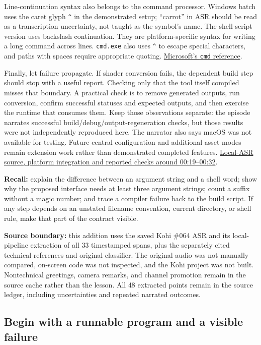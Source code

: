 Line-continuation syntax also belongs to the command processor. Windows batch uses the caret glyph \texttt{\^{}} in the demonstrated setup; ``carrot'' in ASR should be read as a transcription uncertainty, not taught as the symbol's name. The shell-script version uses backslash continuation. They are platform-specific syntax for writing a long command across lines. \texttt{cmd.exe} also uses \texttt{\^{}} to escape special characters, and paths with spaces require appropriate quoting. \href{https://learn.microsoft.com/en-us/windows-server/administration/windows-commands/cmd}{Microsoft's \texttt{cmd} reference}.

Finally, let failure propagate. If shader conversion fails, the dependent build step should stop with a useful report. Checking only that the tool itself compiled misses that boundary. A practical check is to remove generated outputs, run conversion, confirm successful statuses and expected outputs, and then exercise the runtime that consumes them. Keep those observations separate: the episode narrates successful build/debug/output-regeneration checks, but those results were not independently reproduced here. The narrator also says macOS was not available for testing. Future central configuration and additional asset modes remain extension work rather than demonstrated completed features. \href{https://www.youtube.com/watch?v=cCEmwjfHIkY&t=1167}{Local-ASR source, platform integration and reported checks around 00:19--00:32}.

\textbf{Recall:} explain the difference between an argument string and a shell word; show why the proposed interface needs at least three argument strings; count a suffix without a magic number; and trace a compiler failure back to the build script. If any step depends on an unstated filename convention, current directory, or shell rule, make that part of the contract visible.

\textbf{Source boundary:} this addition uses the saved Kohi \#064 ASR and its local-pipeline extraction of all 33 timestamped spans, plus the separately cited technical references and original classifier. The original audio was not manually compared, on-screen code was not inspected, and the Kohi project was not built. Nontechnical greetings, camera remarks, and channel promotion remain in the source cache rather than the lesson. All 48 extracted points remain in the source ledger, including uncertainties and repeated narrated outcomes.

\subsection{Begin with a runnable program and a visible failure}\label{05-engine-i-ch013-begin-with-a-runnable-program-and-a-visible-failure}

